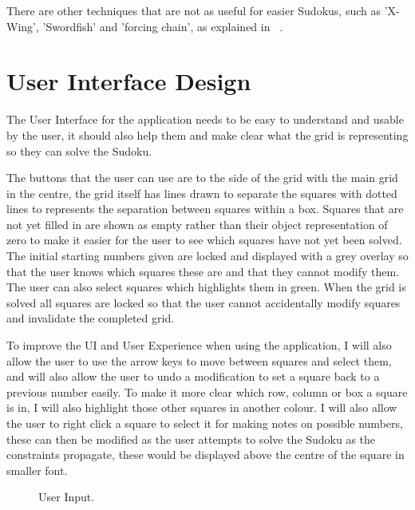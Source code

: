\documentclass[]{final_report}
\begin{document}
There are other techniques that are not as useful for easier Sudokus, such as 'X-Wing', 'Swordfish' and 'forcing chain', as explained in ~\cite{KRISTANIX:2019}.

\section*{User Interface Design}

The User Interface for the application needs to be easy to understand and usable by the user, it should also help them and make clear what the grid is representing so they can solve the Sudoku.

The buttons that the user can use are to the side of the grid with the main grid in the centre, the grid itself has lines drawn to separate the squares with dotted lines to represents the separation between squares within a box. Squares that are not yet filled in are shown as empty rather than their object representation of zero to make it easier for the user to see which squares have not yet been solved. The initial starting numbers given are locked and displayed with a grey overlay so that the user knows which squares these are and that they cannot modify them. The user can also select squares which highlights them in green. When the grid is solved all squares are locked so that the user cannot accidentally modify squares and invalidate the completed grid.

To improve the UI and User Experience when using the application, I will also allow the user to use the arrow keys to move between squares and select them, and will also allow the user to undo a modification to set a square back to a previous number easily. To make it more clear which row, column or box a square is in, I will also highlight those other squares in another colour. I will also allow the user to right click a square to select it for making notes on possible numbers, these can then be modified as the user attempts to solve the Sudoku as the constraints propagate, these would be displayed above the centre of the square in smaller font.

\newpage

\begin{figure}[h]
	\centering
	\fboxsep 2mm
	\caption{\label{fig:user} User Input.}
\end{figure}
\end{document}
